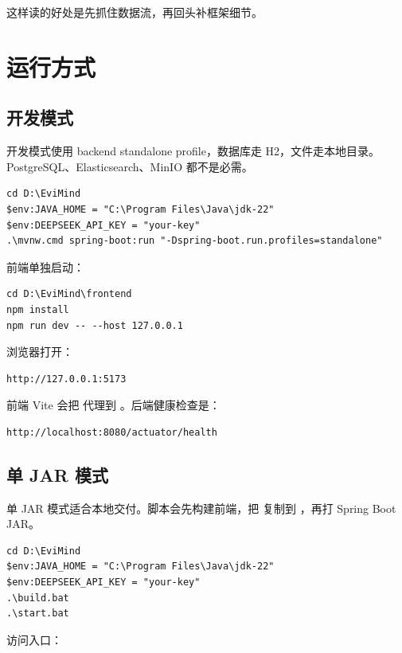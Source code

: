\documentclass[UTF8,zihao=-4]{ctexart}
\begin{document}
这样读的好处是先抓住数据流，再回头补框架细节。

\section{运行方式}

\subsection{开发模式}

开发模式使用 backend standalone profile，数据库走 H2，文件走本地目录。PostgreSQL、Elasticsearch、MinIO 都不是必需。

\begin{lstlisting}[style=code]
cd D:\EviMind
$env:JAVA_HOME = "C:\Program Files\Java\jdk-22"
$env:DEEPSEEK_API_KEY = "your-key"
.\mvnw.cmd spring-boot:run "-Dspring-boot.run.profiles=standalone"
\end{lstlisting}

前端单独启动：

\begin{lstlisting}[style=code]
cd D:\EviMind\frontend
npm install
npm run dev -- --host 127.0.0.1
\end{lstlisting}

浏览器打开：

\begin{lstlisting}[style=code]
http://127.0.0.1:5173
\end{lstlisting}

前端 Vite 会把  代理到 。后端健康检查是：

\begin{lstlisting}[style=code]
http://localhost:8080/actuator/health
\end{lstlisting}

\subsection{单 JAR 模式}

单 JAR 模式适合本地交付。脚本会先构建前端，把  复制到 ，再打 Spring Boot JAR。

\begin{lstlisting}[style=code]
cd D:\EviMind
$env:JAVA_HOME = "C:\Program Files\Java\jdk-22"
$env:DEEPSEEK_API_KEY = "your-key"
.\build.bat
.\start.bat
\end{lstlisting}

访问入口：
\end{document}
